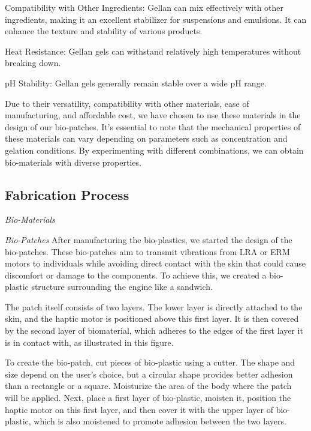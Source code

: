 \item Compatibility with Other Ingredients: Gellan can mix effectively with other ingredients, making it an excellent stabilizer for suspensions and emulsions. It can enhance the texture and stability of various products.

\item Heat Resistance: Gellan gels can withstand relatively high temperatures without breaking down.

\item pH Stability: Gellan gels generally remain stable over a wide pH range.

Due to their versatility, compatibility with other materials, ease of manufacturing, and affordable cost, we have chosen to use these materials in the design of our bio-patches. It's essential to note that the mechanical properties of these materials can vary depending on parameters such as concentration and gelation conditions. By experimenting with different combinations, we can obtain bio-materials with diverse properties.

\subsection{Fabrication Process}
\textit{Bio-Materials}


\textit{Bio-Patches}
After manufacturing the bio-plastics, we started the design of the bio-patches. These bio-patches aim to transmit vibrations from LRA or ERM motors to individuals while avoiding direct contact with the skin that could cause discomfort or damage to the components. To achieve this, we created a bio-plastic structure surrounding the engine like a sandwich.

The patch itself consists of two layers. The lower layer is directly attached to the skin, and the haptic motor is positioned above this first layer. It is then covered by the second layer of biomaterial, which adheres to the edges of the first layer it is in contact with, as illustrated in this figure.

To create the bio-patch, cut pieces of bio-plastic using a cutter. The shape and size depend on the user's choice, but a circular shape provides better adhesion than a rectangle or a square. Moisturize the area of the body where the patch will be applied. Next, place a first layer of bio-plastic, moisten it, position the haptic motor on this first layer, and then cover it with the upper layer of bio-plastic, which is also moistened to promote adhesion between the two layers.

